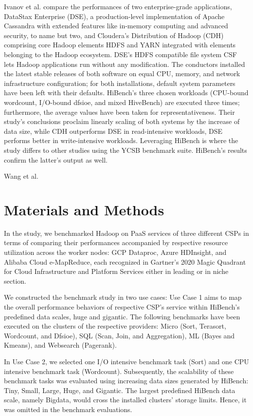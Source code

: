 \documentclass[review]{elsarticle}
\begin{document}
Ivanov et al. \cite{ivanov_performance_2015} compare the performances of two enterprise-grade applications, DataStax Enterprise (DSE), a production-level implementation of Apache Cassandra with extended features like in-memory computing and advanced security, to name but two, and Cloudera's Distribution of Hadoop (CDH) comprising core Hadoop elements HDFS and YARN integrated with elements belonging to the Hadoop ecosystem. DSE's HDFS compatible file system CSF lets Hadoop applications run without any modification. The conductors installed the latest stable releases of both software on equal CPU, memory, and network infrastructure configuration; for both installations, default system parameters have been left with their defaults. HiBench's three chosen workloads (CPU-bound wordcount, I/O-bound dfsioe, and mixed HiveBench) are executed three times; furthermore, the average values have been taken for representativeness. Their study's conclusions proclaim linearly scaling of both systems by the increase of data size, while CDH outperforms DSE in read-intensive workloads, DSE performs better in write-intensive workloads. Leveraging HiBench is where the study differs to other studies using the YCSB benchmark suite. HiBench's results confirm the latter's output as well.

Wang et al. \cite{wang_improved_2020} 


\section{Materials and Methods}
In the study, we benchmarked Hadoop on PaaS services of three different CSPs in terms of comparing their performances accompanied by respective resource utilization across the worker nodes: GCP Dataproc, Azure HDInsight, and Alibaba Cloud e-MapReduce, each recognized in Gartner's 2020 Magic Quadrant for Cloud Infrastructure and Platform Services \cite{noauthor_gartner_nodate} either in leading or in niche section.

We constructed the benchmark study in two use cases: Use Case 1 aims to map the overall performance behaviors of respective CSP's service within HiBench's predefined data scales, huge and gigantic. The following benchmarks have been executed on the clusters of the respective providers: Micro (Sort, Terasort, Wordcount, and Dfsioe), SQL (Scan, Join, and Aggregation), ML (Bayes and Kmeans), and Websearch (Pagerank).

In Use Case 2, we selected one I/O intensive benchmark task (Sort) and one CPU intensive benchmark task (Wordcount). Subsequently, the scalability of these benchmark tasks was evaluated using increasing data sizes generated by HiBench: Tiny, Small, Large, Huge, and Gigantic. The largest predefined HiBench data scale, namely Bigdata, would cross the installed clusters' storage limits. Hence, it was omitted in the benchmark evaluations.
\end{document}
